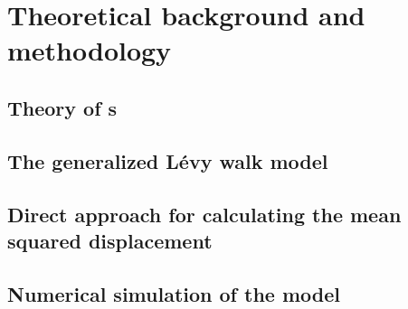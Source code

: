 \chapter{Theoretical background and methodology}

\section{Theory of s}






\section{The generalized L\'evy walk model}

\section{Direct approach for calculating the mean squared displacement}

\section{Numerical simulation of the model}